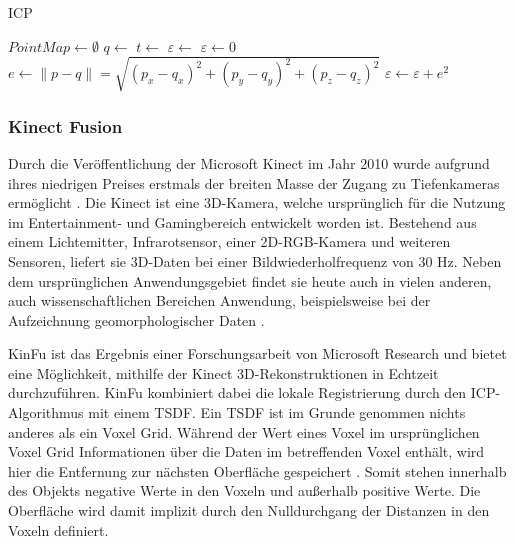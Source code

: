 \begin{algorithm}[ht]
\caption{\acl{ICP}}
\label{alg:icp}
\begin{algorithmic}
	\State $PointMap \gets \emptyset$
		\State $q \gets$ 
			\State {}
		\EndIf
	\EndFor
		\State $t \gets$ 
		\State {}
		\State $\varepsilon \gets$ 
	\EndWhile
\EndFunction
{}
	\State $\varepsilon \gets 0$
		\State $e \gets \|p - q\| = \sqrt{(p_x - q_x)^2 + (p_y - q_y)^2 + (p_z - q_z)^2}$
		\State $\varepsilon \gets \varepsilon + e^2$
	\EndFor
	\State \Return{$\varepsilon$}
\EndFunction
\end{algorithmic}
\end{algorithm}


\subsubsection{Kinect Fusion}
\label{subsubsec:kinfu}

Durch die Veröffentlichung der Microsoft Kinect im Jahr 2010 wurde aufgrund ihres niedrigen Preises erstmals der breiten Masse der Zugang zu Tiefenkameras ermöglicht \cite[1:55]{kinfuTalkYoutube}.
Die Kinect ist eine 3D-Kamera, welche ursprünglich für die Nutzung im Entertainment- und Gamingbereich entwickelt worden ist.
Bestehend aus einem Lichtemitter, Infrarotsensor, einer 2D-RGB-Kamera und weiteren Sensoren, liefert sie 3D-Daten bei einer Bildwiederholfrequenz von 30 Hz.
Neben dem ursprünglichen Anwendungsgebiet findet sie heute auch in vielen anderen, auch wissenschaftlichen Bereichen Anwendung, beispielsweise bei der Aufzeichnung geomorphologischer Daten \cite{mankoff2013kinect}.

\ac{KinFu} ist das Ergebnis einer Forschungsarbeit von Microsoft Research \cite{izadi2011kinectfusion, microsoftKinfuYoutube} und bietet eine Möglichkeit, mithilfe der Kinect 3D-Rekonstruktionen in Echtzeit durchzuführen.
\ac{KinFu} kombiniert dabei die lokale Registrierung durch den \ac{ICP}-Algorithmus mit einem \ac{TSDF}.
Ein \ac{TSDF} ist im Grunde genommen nichts anderes als ein Voxel Grid.
Während der Wert eines Voxel im ursprünglichen Voxel Grid Informationen über die Daten im betreffenden Voxel enthält, wird hier die Entfernung zur nächsten Oberfläche gespeichert \cite{curless1996volumetric}.
Somit stehen innerhalb des Objekts negative Werte in den Voxeln und außerhalb positive Werte.
Die Oberfläche wird damit implizit durch den Nulldurchgang der Distanzen in den Voxeln definiert.

